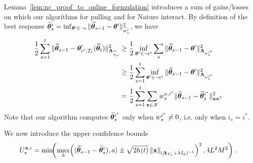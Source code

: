 Lemma~\ref{lem:nc_proof_to_online_formulation} introduces a sum of gains/losses on which our algorithms for pulling and for Nature interact.
By definition of the best response $\widetilde{{\boldsymbol \theta}}_s^i = \inf_{{\boldsymbol \theta}' \in \neg i} \Vert \widehat{{\boldsymbol \theta}}_{s-1} - {\boldsymbol \theta}' \Vert_{\widetilde{w}_s^i}^2$, we have
\begin{align}
\frac{1}{2}\sum_{s=1}^t  \Vert \widehat{{\boldsymbol \theta}}_{s-1} - {\boldsymbol \theta}'_{i^\star,T_t}(\widehat{{\boldsymbol \theta}}_t)\Vert_{{\boldsymbol \Lambda}_{\widetilde{w}_s}}^2
&\ge \frac{1}{2} \inf_{{\boldsymbol \theta}' \in \neg i^\star} \sum_s \Vert \widehat{{\boldsymbol \theta}}_{s-1} - {\boldsymbol \theta}'\Vert_{{\boldsymbol \Lambda}_{w_s^{i^\star}}}^2
\nonumber\\
&\geq \frac{1}{2}\sum_{s=1}^t \inf_{{\boldsymbol \theta}' \in \neg i^\star} \Vert \widehat{{\boldsymbol \theta}}_{s-1} - {\boldsymbol \theta}'\Vert_{{\boldsymbol \Lambda}_{w_s^{i^\star}}}^2
\nonumber\\
&= \frac{1}{2}\sum_{s=1}^t \sum_{{\bf x}\in\mathcal{X}} w_s^{a,i^\star}\Vert \widehat{{\boldsymbol \theta}}_{s-1} - \widetilde{{\boldsymbol \theta}}_s^{i^\star}\Vert_{{\bf x}{\bf x}^\mathsf{\scriptscriptstyle T}}^2\label{eq:only_istar}
\end{align}
Note that our algorithm computes $\widetilde{{\boldsymbol \theta}}_s^{i^\star}$ only when $w_s^{i^\star} \neq 0$, i.e. only when $i_s = i^*$.

We now introduce the upper confidence bounds
\[
    U_s^{{\bf x},i} = \min\!\!\left(\max_\pm\! \left( \langle \widehat{{\boldsymbol \theta}}_{s-1} - \widetilde{{\boldsymbol \theta}}^{i}_s), a\rangle \pm \sqrt{2 h(t)} \left\lVert{\bf x}\right\rVert_{({\boldsymbol \Lambda}_{T_s}+\lambda I_d)^{-1} } \right)^2,4L^2M^2\right)\,.
\]

